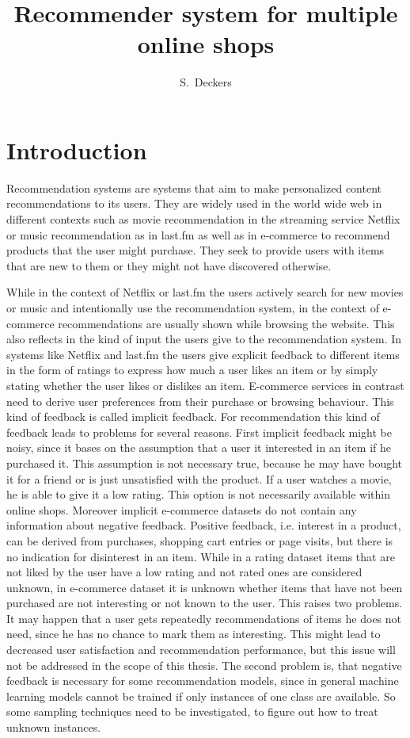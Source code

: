 \documentclass[10pt]{reportMaster}
\title{Recommender system for multiple online shops}
\author{S.\ Deckers}
\date{} %
\begin{document}
\maketitle

\tableofcontents

\chapter{Introduction}
Recommendation systems are systems that aim to make personalized content recommendations to its users.
They are widely used in the world wide web in different contexts such as movie recommendation in the streaming service Netflix or music recommendation as in last.fm as well as in e-commerce to recommend products that the user might purchase.
They seek to provide users with items that are new to them or they might not have discovered otherwise.

While in the context of Netflix or last.fm the users actively search for new movies or music and intentionally use the recommendation system, in the context of e-commerce recommendations are usually shown while browsing the website.
This also reflects in the kind of input the users give to the recommendation system.
In systems like Netflix and last.fm the users give explicit feedback to different items in the form of ratings to express how much a user likes an item or by simply stating whether the user likes or dislikes an item.
E-commerce services in contrast need to derive user preferences from their purchase or browsing behaviour.
This kind of feedback is called implicit feedback.
For recommendation this kind of feedback leads to problems for several reasons.
First implicit feedback might be noisy, since it bases on the assumption that a user it interested in an item if he purchased it.
This assumption is not necessary true, because he may have bought it for a friend or is just unsatisfied with the product.
If a user watches a movie, he is able to give it a low rating.
This option is not necessarily available within online shops.
Moreover implicit e-commerce datasets do not contain any information about negative feedback.
Positive feedback, i.e. interest in a product, can be derived from purchases, shopping cart entries or page visits, but there is no indication for disinterest in an item.
While in a rating dataset items that are not liked by the user have a low rating and not rated ones are considered unknown, in e-commerce dataset it is unknown whether items that have not been purchased are not interesting or not known to the user.
This raises two problems.
It may happen that a user gets repeatedly recommendations of items he does not need, since he has no chance to mark them as interesting.
This might lead to decreased user satisfaction and recommendation performance, but this issue will not be addressed in the scope of this thesis.
The second problem is, that negative feedback is necessary for some recommendation models, since in general machine learning models cannot be trained if only instances of one class are available.
So some sampling techniques need to be investigated, to figure out how to treat unknown instances.
\end{document}
